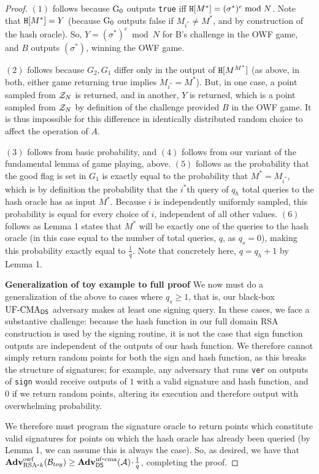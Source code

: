 \begin{proof}
$(1)$ follows because ${{\textnormal G}}_0$ outputs \texttt{true} iff $\mathtt{H}[M^*] = (\sigma^*)^e \bmod N$.  Note that $\mathtt{H}[M^*] = Y$ (because ${{\textnormal G}}_0$ outputs false if $M_{i^*}\neq M^*$, and by construction of the hash oracle).  So, $Y=(\sigma^*)^e \bmod N$ for B's challenge in the OWF game, and $B$ outputs $(\sigma^*)$, winning the OWF game.

$(2)$ follows because $G_2, G_1$ differ only in the output of $\mathtt{H}[M^{M^*}]$ (as above, in both, either game returning true implies $M_{i^*} = M^*$).  But, in one case, a point sampled from $\mathcal{Z}_N$ is returned, and in another, $Y$ is returned, which is a point sampled from $\mathcal{Z}_N$ by definition of the challenge provided $B$ in the OWF game.  It is thus impossible for this difference in identically distributed random choice to affect the operation of $A$.

$(3)$ follows from basic probability, and $(4)$ follows from our variant of the fundamental lemma of game playing, above.  $(5)$ follows as the probability that the good flag is set in $G_1$ is exactly equal to the probability that $M^* = M_{i^*}$, which is by definition the probability that the $i^*$th query of $q_h$ total queries to the hash oracle has as input $M^*$.  Because $i$ is independently uniformly sampled, this probability is equal for every choice of $i$, independent of all other values. $(6)$ follows as Lemma 1 states that $M^*$ will be exactly one of the queries to the hash oracle (in this case equal to the number of total queries, $q$, as $q_s=0$), making this probability exactly equal to $\frac{1}{q}$.  Note that concretely here, $q=q_h+1$ by Lemma 1.

\textbf{Generalization of toy example to full proof}  We now must do a generalization of the above to cases where $q_s \geq 1$, that is, our black-box $\textnormal{UF-CMA}_{\mathsf{DS}}$ adversary makes at least one signing query.  In these cases, we face a substantive challenge: because the hash function in our full domain RSA construction is used by the signing routine, it is not the case that sign function outputs are independent of the outputs of our hash function.  We therefore cannot simply return random points for both the sign and hash function, as this breaks the structure of signatures; for example, any adversary that runs \texttt{ver} on outputs of \texttt{sign} would receive outputs of $1$ with a valid signature and hash function, and $0$ if we return random points, altering its execution and therefore output with overwhelming probability.

We therefore must program the signature oracle to return points which constitute valid signatures for points on which the hash oracle has already been queried (by Lemma 1, we can assume this is always the case).  So, as desired, we have that $\mathbf{Adv}^{\mathrm{owf}}_{{\textnormal{RSA}\mbox{-} k}}({\mathcal B}_{toy}) \ge \mathbf{Adv}^{\mathrm{uf\mbox{-} cma}}_{{\mathsf{DS}}}({\mathcal A}){\hspace{-0.1ex}}{\hspace{-0.1ex}}{\hspace{-0.1ex}}\cdot{\hspace{-0.1ex}}{\hspace{-0.1ex}}{\hspace{-0.1ex}}\frac{1}{q}$, completing the proof.




\end{proof}
